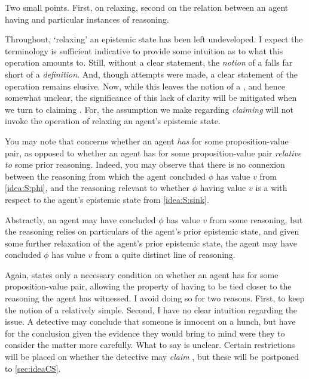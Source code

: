\begin{note}
  Two small points.
  First, on relaxing, second on the relation between an agent having \support{} and particular instances of reasoning.
\end{note}

\begin{note}[`Relaxing']
  Throughout, `relaxing' an epistemic state has been left undeveloped.
  I expect the terminology is sufficient indicative to provide some intuition as to what this operation amounts to.
  Still, without a clear statement, the \emph{notion} of a \sink{} falls far short of a \emph{definition}.
  And, though attempts were made, a clear statement of the operation remains elusive.
  Now, while this leaves the notion of a \sink{}, and hence \ideaS{} somewhat unclear, the significance of this lack of clarity will be mitigated when we turn to claiming \support{}.
  For, the assumption we make regarding \emph{claiming} \support{} will not invoke the operation of relaxing an agent's epistemic state.
\end{note}

\begin{note}
  You may note that \ideaS{} concerns whether an agent \emph{has} \support{} for some proposition-value pair, as opposed to whether an agent has \support{} for some proposition-value pair \emph{relative to} some prior reasoning.
  Indeed, you may observe that there is no connexion between the reasoning from which the agent concluded \(\phi\) has value \(v\) from \ref{idea:S:phi}, and the reasoning relevant to whether \(\phi\) having value \(v\) is a \sink{} with respect to the agent's epistemic state from \ref{idea:S:sink}.

  Abstractly, an agent may have concluded \(\phi\) has value \(v\) from some reasoning, but the reasoning relies on particulars of the agent's prior epistemic state, and given some further relaxation of the agent's prior epistemic state, the agent may have concluded \(\phi\) has value \(v\) from a quite distinct line of reasoning.

  Again, \ideaS{} states only a necessary condition on whether an agent has \support{} for some proposition-value pair, allowing the property of having \support{} to be tied closer to the reasoning the agent has witnessed.
  I avoid doing so for two reasons.
  First, to keep the notion of a \sink{} relatively simple.
  Second, I have no clear intuition regarding the issue.
  A detective may conclude that someone is innocent on a hunch, but have \support{} for the conclusion given the evidence they would bring to mind were they to consider the matter more carefully.
  What to say is unclear.
  Certain restrictions will be placed on whether the detective may \emph{claim} \support{}, but these will be postponed to \autoref{sec:ideaCS}.
\end{note}

